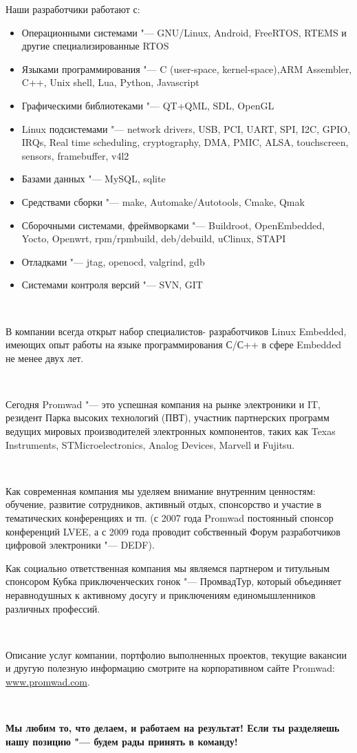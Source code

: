 \documentclass[10pt, a5paper]{article}
\begin{document}
Наши разработчики работают с:
\begin{itemize}
\item Операционными системами "--- GNU/Linux, Android, FreeRTOS, RTEMS и другие специализированные RTOS
\item Языками программирования "--- C (user-space, kernel-space),\linebreak ARM Assembler, C++, Unix shell, Lua, Python, Javascript
\item Графическими библиотеками "--- QT+QML, SDL, OpenGL
\item Linux подсистемами "--- network drivers, USB, PCI, UART, SPI, I2C, GPIO, IRQs, Real time scheduling, cryptography, DMA, PMIC, ALSA, touchscreen, sensors, framebuffer, v4l2
\item Базами данных "--- MySQL, sqlite
\item Средствами сборки "--- make, Automake/Autotools, Cmake, \linebreak Qmak
\item Сборочными системами, фреймворками "--- Buildroot, \linebreak OpenEmbedded, Yocto, Openwrt, rpm/rpmbuild, deb/debuild, uClinux, STAPI
\item Отладками "--- jtag, openocd, valgrind, gdb
\item Системами контроля версий "--- SVN, GIT
\end{itemize}

~

В компании всегда открыт набор специалистов- разработчиков Linux Embedded, имеющих опыт работы  на языке программирования С/С++  в сфере Embedded не менее двух лет.

~

Сегодня Promwad "--- это успешная компания на рынке электроники и IT, резидент Парка высоких технологий (ПВТ), участник партнерских программ ведущих мировых производителей электронных компонентов, таких как Texas Instruments, STMicroelectronics, Analog Devices, Marvell и Fujitsu. 

~

Как современная компания мы уделяем внимание внутренним ценностям: обучение, развитие сотрудников, активный отдых, спонсорство и участие в тематических конференциях и тп. (с 2007 года Promwad постоянный спонсор конференций LVEE, а с 2009 года проводит собственный Форум разработчиков цифровой электроники "--- DEDF).

Как социально ответственная компания мы являемся партнером и титульным спонсором Кубка приключенческих гонок "--- ПромвадТур, который объединяет неравнодушных к активному досугу и приключениям единомышленников различных профессий. 

~

Описание услуг  компании, портфолио выполненных проектов, текущие вакансии и другую полезную информацию смотрите на корпоративном сайте Promwad: \url{www.promwad.com}.

~
\begin{center}
{\bf Мы любим то, что делаем, и работаем на результат! Если ты разделяешь нашу позицию "--- будем рады принять в команду!}
\end{center}
\end{document}
